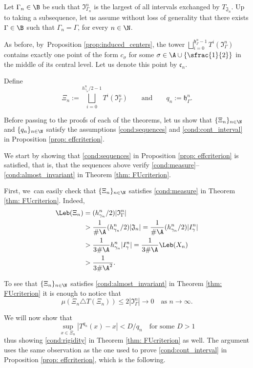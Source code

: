 Let $\Gamma_n \in \B$ be such that $\mathfrak I_{\Gamma_n}^n$ is the largest of all intervals exchanged by $T_{\mathfrak J_n}$. Up to taking a subsequence, let us assume without loss of generality that there exists $\Gamma \in \B$ such that $\Gamma_n = \Gamma$, for every $n \in \N$.

As before, by~Proposition \ref{prop:induced_centers}, the tower $\bigsqcup_{i=0}^{\mathfrak h_{\Gamma}^n-1}T^i(\mathfrak I_{\Gamma}^n)$ contains exactly one point of the form $c_{\sigma}$ for some $\sigma \in \A \cup \{\sfrac{1}{2}\}$ in the middle of its central level. Let us denote this point by $\mathfrak c_n$.

Define
\[
\Xi_n:=\bigsqcup_{i=0}^{h_{\gamma_n}^n/2-1}T^{i}(\mathfrak I_{\Gamma}^n)\qquad \text{and}\qquad q_n:=\mathfrak h_{\Gamma}^n.
\]

Before passing to the proofs of each of the theorems, let us show that $\{\Xi_n\}_{n\in\N}$ and $\{q_n\}_{n\in\N}$ satisfy the assumptions \eqref{cond:sequences} and \eqref{cond:cont_interval} in Proposition \ref{prop: effcriterion}.

We start by showing that \eqref{cond:sequences} in Proposition \ref{prop: effcriterion} is satisfied, that is, that the sequences above verify \eqref{cond:measure}--\eqref{cond:almost_invariant} in Theorem \ref{thm: FUcriterion}.

First, we~can easily check that $\{\Xi_n\}_{n \in \N}$ satisfies \eqref{cond:measure} in Theorem \ref{thm: FUcriterion}. Indeed,
\begin{align*}
\Leb(\Xi_n) & =(h_{\gamma_n}^n/2)|\mathfrak I_{\Gamma}^n| \\ & > \frac{1}{\#\A}(h_{\gamma_n}^n/2)|\mathfrak J_n|=\frac{1}{\#\A}(h_{\gamma_n}^n/2)|I^n_{\gamma}| \\
& > \frac{1}{3\#\A} h_{\gamma_n}^n|I^n_{\gamma}|=\frac{1}{3\#\A} \Leb(X_n) \\
& >\frac{1}{3\#\A^2}.
\end{align*}

To see that $\{\Xi_n\}_{n\in\N}$ satisfies \eqref{cond:almost_invariant} in Theorem \ref{thm: FUcriterion} it is enough to notice that
\[
\mu(\Xi_n\triangle T(\Xi_n))\le 2|\mathfrak I_{\Gamma}^n|\to 0 \quad\text{as }n\to\infty.
\]

We will now show that
\begin{equation}\label{eq: derbound}
\sup_{x\in\Xi_n}|T^{q_n}(x)-x|<D/q_n\quad\text{for some }D>1
\end{equation}
thus showing \eqref{cond:rigidity} in Theorem \ref{thm: FUcriterion} as well. The argument uses the same observation as the one used to prove \eqref{cond:cont_interval} in Proposition \ref{prop: effcriterion}, which is the following.

